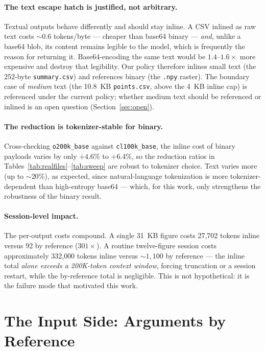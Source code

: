 \documentclass[11pt]{article}
\newcommand{\bref}{by reference}
\begin{document}
\paragraph{The text escape hatch is justified, not arbitrary.} Textual outputs behave differently and should stay inline. A CSV inlined as raw text costs ${\sim}0.6$ tokens/byte --- cheaper than base64 binary --- \emph{and}, unlike a base64 blob, its content remains legible to the model, which is frequently the reason for returning it. Base64-encoding the same text would be $1.4$--$1.6\times$ more expensive and destroy that legibility. Our policy therefore inlines small text (the 252-byte \texttt{summary.csv}) and references binary (the \texttt{.npy} raster). The boundary case of \emph{medium} text (the 10.8~KB \texttt{points.csv}, above the 4~KB inline cap) is referenced under the current policy; whether medium text should be referenced or inlined is an open question (Section~\ref{sec:open}).

\paragraph{The reduction is tokenizer-stable for binary.} Cross-checking \texttt{o200k\_base} against \texttt{cl100k\_base}, the inline cost of binary payloads varies by only $+4.6\%$ to $+6.4\%$, so the reduction ratios in Tables~\ref{tab:realfiles}--\ref{tab:sweep} are robust to tokenizer choice. Text varies more (up to ${\sim}20\%$), as expected, since natural-language tokenization is more tokenizer-dependent than high-entropy base64 --- which, for this work, only strengthens the robustness of the binary result.

\paragraph{Session-level impact.} The per-output costs compound. A single 31~KB figure costs 27{,}702 tokens inline versus 92 \bref{} ($301\times$). A routine twelve-figure session costs approximately 332{,}000 tokens inline versus ${\sim}1{,}100$ \bref{} --- the inline total \emph{alone exceeds a 200K-token context window}, forcing truncation or a session restart, while the by-reference total is negligible. This is not hypothetical: it is the failure mode that motivated this work.

\section{The Input Side: Arguments by Reference}\label{sec:input}
\end{document}
